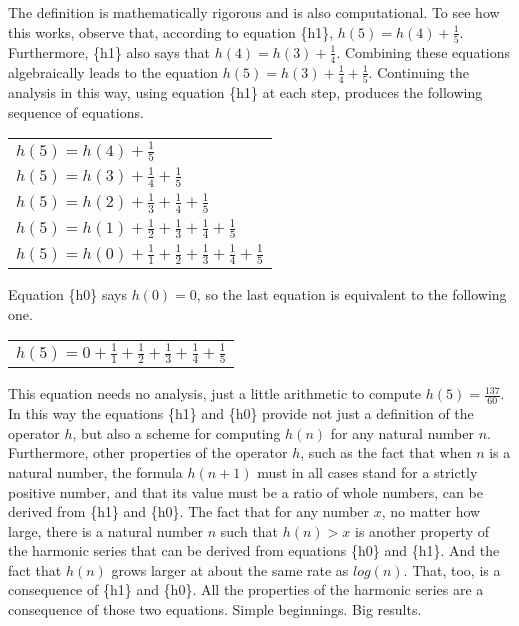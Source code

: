 The definition is mathematically rigorous
and is also computational.
To see how this works, observe that, according to equation \{h1\},
$h(5) = h(4)+\frac{1}{5}$.
Furthermore, \{h1\} also says that $h(4) = h(3)+\frac{1}{4}$.
Combining these equations algebraically leads to the equation
$h(5) = h(3)+\frac{1}{4}+\frac{1}{5}$.
Continuing the analysis in this way, using equation \{h1\} at each step,
produces the following sequence of equations.
\begin{center}
\begin{tabular}{l}
$h(5) = h(4) + \frac{1}{5}$ \\
$h(5) = h(3) + \frac{1}{4} + \frac{1}{5}$\\
$h(5) = h(2) + \frac{1}{3} + \frac{1}{4} + \frac{1}{5}$\\
$h(5) = h(1) + \frac{1}{2} + \frac{1}{3} + \frac{1}{4} + \frac{1}{5}$\\
$h(5) = h(0) + \frac{1}{1} + \frac{1}{2} + \frac{1}{3} + \frac{1}{4} + \frac{1}{5}$\\
\end{tabular}
\end{center}

Equation \{h0\} says $h(0) = 0$,
so the last equation is equivalent to the following one.
\begin{center}
\begin{tabular}{l}
$h(5) = 0 + \frac{1}{1} + \frac{1}{2} + \frac{1}{3} + \frac{1}{4} + \frac{1}{5}$\\
\end{tabular}
\end{center}

This equation needs no analysis, just a little arithmetic
to compute $h(5) = \frac{137}{60}$.
In this way the equations \{h1\} and \{h0\} provide not just
a definition of the operator $h$, but also a scheme for computing $h(n)$
for any natural number $n$.
Furthermore, other properties of the operator $h$,
such as the fact that when $n$ is a natural number,
the formula $h(n+1)$ must in all cases stand for a strictly positive number,
and that its value must be a ratio of whole numbers,
can be derived from \{h1\} and \{h0\}.
The fact that for any number $x$, no matter how large,
there is a natural number $n$ such that $h(n) > x$
is another property of the harmonic series that can be
derived from equations \{h0\} and \{h1\}.
And the fact that $h(n)$ grows larger at about
the same rate as $log(n)$. That, too, is a consequence
of \{h1\} and \{h0\}. All the properties of the
harmonic series are a consequence of those two equations.
Simple beginnings. Big results.

